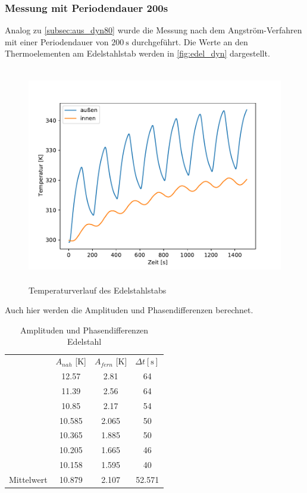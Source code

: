 \subsubsection{Messung mit Periodendauer 200s}
\label{subsubsec:aus_dyn200}

Analog zu \autoref{subsec:aus_dyn80} wurde die Messung nach dem Angström-Verfahren mit einer Periodendauer von $\qty{200}{\second}$ durchgeführt.
Die Werte an den Thermoelementen am Edelstahlstab werden in \autoref{fig:edel_dyn} dargestellt.

\begin{figure}[H]
  \centering
  \includegraphics[height=9.5cm]{content/dyn_2.pdf}
  \caption{Temperaturverlauf des Edelstahlstabs}
  \label{fig:edel_dyn}
\end{figure}

Auch hier werden die Amplituden und Phasendifferenzen berechnet.
\begin{table}[H]
	\centering
	\caption{Amplituden und Phasendifferenzen Edelstahl}
	\label{tab:AuPE}
	\begin{tabular}{l S S S[table-format=2.0]}
		\toprule
		&{$A_{nah}$ [K]} & {$A_{fern}$ [K]} &{$\Delta t [\si{\second}]$}\\
		\cmidrule(lr) {2-4}
		& 12.57 & 2.81& 64 \\
    & 11.39& 2.56 & 64\\
    &10.85& 2.17 & 54\\
    & 10.585 & 2.065 & 50 \\
    & 10.365& 1.885& 50\\
    & 10.205& 1.665& 46\\
    & 10.158& 1.595 & 40\\
    \cmidrule(lr) {2-4}
    {Mittelwert}&10.879&2.107 &52.571 \\
		\bottomrule
	\end{tabular}
\end{table}	


